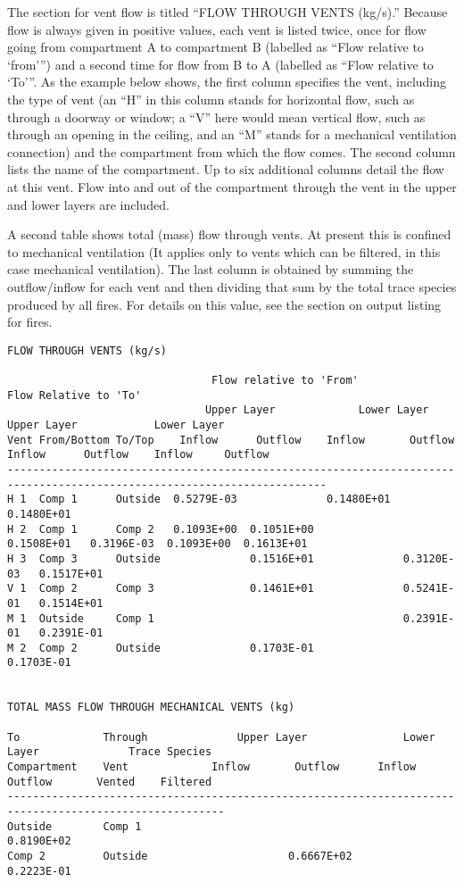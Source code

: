 The section for vent flow is titled ``FLOW THROUGH VENTS (kg/s).''  Because flow is always given in positive values, each vent is listed twice, once for flow going from compartment A to compartment B (labelled as ``Flow relative to `from''') and a second time for flow from B to A (labelled as ``Flow relative to `To'''.  As the example below shows, the first column specifies the vent, including the type of vent (an ``H'' in this column stands for horizontal flow, such as through a doorway or window; a ``V'' here would mean vertical flow, such as through an opening in the ceiling, and an ``M'' stands for a mechanical ventilation connection) and the compartment from which the flow comes. The second column lists the name of the compartment. Up to six additional columns detail the flow at this vent. Flow into and out of the compartment through the vent in the upper and lower layers are included.

A second table shows total (mass) flow through vents. At present this is confined to mechanical ventilation (It applies only to vents which can be filtered, in this case mechanical ventilation). The last column is obtained by summing the outflow/inflow for each vent and then dividing that sum by the total trace species produced by all fires. For details on this value, see the section on output listing for fires.

\begin{lstlisting}[basicstyle=\tiny]
FLOW THROUGH VENTS (kg/s)

                                Flow relative to 'From'                             Flow Relative to 'To'
                               Upper Layer             Lower Layer              Upper Layer            Lower Layer
Vent From/Bottom To/Top    Inflow      Outflow    Inflow       Outflow      Inflow      Outflow    Inflow     Outflow
------------------------------------------------------------------------------------------------------------------------
H 1  Comp 1      Outside  0.5279E-03              0.1480E+01                                                  0.1480E+01
H 2  Comp 1      Comp 2   0.1093E+00  0.1051E+00              0.1508E+01   0.3196E-03  0.1093E+00  0.1613E+01
H 3  Comp 3      Outside              0.1516E+01              0.3120E-03   0.1517E+01
V 1  Comp 2      Comp 3               0.1461E+01              0.5241E-01   0.1514E+01
M 1  Outside     Comp 1                                       0.2391E-01   0.2391E-01
M 2  Comp 2      Outside              0.1703E-01                                                   0.1703E-01


TOTAL MASS FLOW THROUGH MECHANICAL VENTS (kg)

To             Through              Upper Layer               Lower Layer              Trace Species
Compartment    Vent             Inflow       Outflow      Inflow       Outflow       Vented    Filtered
--------------------------------------------------------------------------------------------------------
Outside        Comp 1                                                 0.8190E+02
Comp 2         Outside                      0.6667E+02                0.2223E-01

\end{lstlisting}


